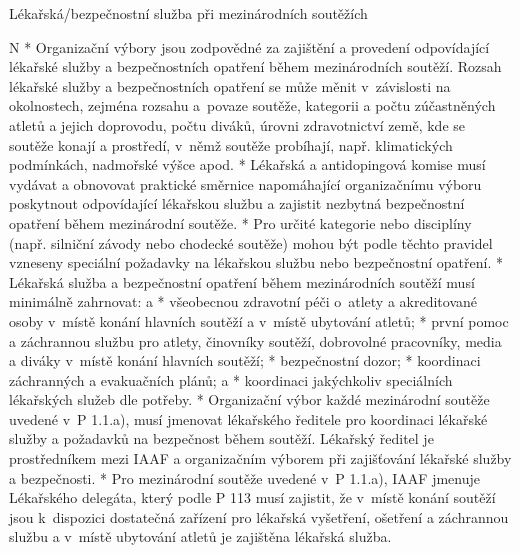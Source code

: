 \secc Lékařská/bezpečnostní služba při mezinárodních soutěžích

\begitems \style N
* Organizační výbory jsou zodpovědné za zajištění a provedení odpovídající lékařské služby a bezpečnostních opatření během mezinárodních soutěží. Rozsah lékařské služby a bezpečnostních opatření se může měnit v~závislosti na okolnostech, zejména rozsahu a~povaze soutěže, kategorii a počtu zúčastněných atletů a jejich doprovodu, počtu diváků, úrovni zdravotnictví země, kde se soutěže konají a prostředí, v~němž soutěže probíhají, např. klimatických podmínkách, nadmořské výšce apod.
* Lékařská a antidopingová komise musí vydávat a obnovovat praktické směrnice napomáhající organizačnímu výboru poskytnout odpovídající lékařskou službu a zajistit nezbytná bezpečnostní opatření během mezinárodní soutěže.
* Pro určité kategorie nebo disciplíny (např. silniční závody nebo chodecké soutěže) mohou být podle těchto pravidel vzneseny speciální požadavky na lékařskou službu nebo bezpečnostní opatření.
* Lékařská služba a bezpečnostní opatření během mezinárodních soutěží musí minimálně zahrnovat:
  \begitems \style a
  * všeobecnou zdravotní péči o~atlety a akreditované osoby v~místě konání hlavních soutěží a v~místě ubytování atletů;
  * první pomoc a záchrannou službu pro atlety, činovníky soutěží, dobrovolné pracovníky, media a diváky v~místě konání hlavních soutěží;
  * bezpečnostní dozor;
  * koordinaci záchranných a evakuačních plánů; a
  * koordinaci jakýchkoliv speciálních lékařských služeb dle potřeby.
  \enditems
* Organizační výbor každé mezinárodní soutěže uvedené v~P 1.1.a), musí jmenovat lékařského ředitele pro koordinaci lékařské služby a požadavků na bezpečnost během soutěží. Lékařský ředitel je prostředníkem mezi IAAF a organizačním výborem při zajišťování lékařské služby a bezpečnosti.
* Pro mezinárodní soutěže uvedené v~P 1.1.a), IAAF jmenuje Lékařského delegáta, který podle P 113 musí zajistit, že v~místě konání soutěží jsou k~dispozici dostatečná zařízení pro lékařská vyšetření, ošetření a záchrannou službu a v~místě ubytování atletů je zajištěna lékařská služba.
\enditems

\endinput